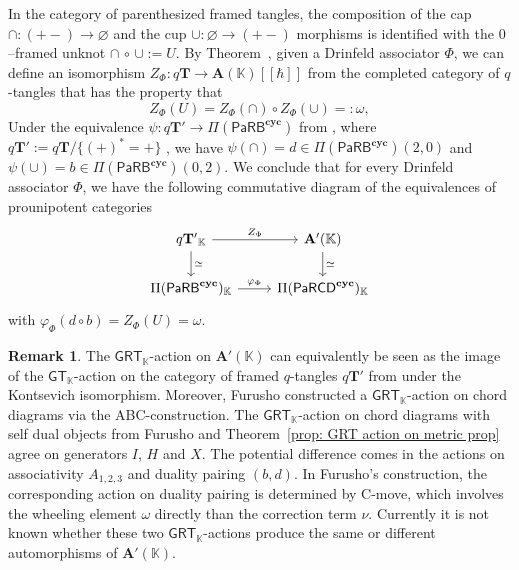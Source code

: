 \documentclass{amsart}
\newcommand{\bT}{\mathbf{T}}
\newcommand{\bA}{\mathbf{A}}
\newcommand{\kk}{\mathbb{K}}    %
\newcommand{\PaRB}{\mathsf{PaRB}}
\newcommand{\PaRCD}{\mathsf{PaRCD}}
\newcommand{\cyc}{\mathbf{cyc}}
\newcommand{\id}{\operatorname{id}}
\newcommand{\GT}{{\mathsf{GT}}}
\newcommand{\GRT}{{\mathsf{GRT}}}
\theoremstyle{definition}
\newtheorem{remark}[theorem]{Remark}%
\numberwithin{equation}{section}
\begin{document}
In the category of parenthesized framed tangles, the composition of the cap $\cap:(+{-})\to \varnothing$ and the cup $\cup:\varnothing \to(+{-})$ morphisms is identified with the $0$--framed unknot $\cap \,\circ \,\cup:= U$. By Theorem~\cite[Theorem 4.7]{KT_Tangles}, given a Drinfeld associator $\Phi$, we can define an isomorphism  $Z_{\Phi}:q\mathbf{T}\rightarrow \bA(\kk)[[\hbar]]$ from the completed category of $q$-tangles that has the property that \[
Z_{\Phi}(U)=Z_{\Phi}(\cap)\circ Z_{\Phi}(\cup)=:\omega, %
\] 
Under the equivalence $\psi: q\mathbf{T'} \rightarrow \Pi(\PaRB^{\cyc})$ from \cite[Proposition~6.5]{RS2025cyclicgt}, where $q\mathbf{T'} := q\mathbf{T}/ \{(+)^* = +\}$ , we have $\psi(\cap) = d \in \Pi(\PaRB^{\cyc})(2,0)$ and $\psi(\cup) = b \in \Pi(\PaRB^{\cyc})(0,2)$. We conclude that for every Drinfeld associator $\Phi$, we have the following commutative diagram of the equivalences of prounipotent categories
\[\begin{tikzcd} q\mathbf{T'}_{\kk}\arrow[d, "\simeq"] \arrow[r, "Z_{\Phi}"] & \bA'(\kk)\arrow[d, "\simeq"]\\
\Pi(\PaRB^{\cyc})_{\kk} \arrow[r, "\varphi_{\Phi}"] & \Pi(\PaRCD^{\cyc})_{\kk}\end{tikzcd}\] with $\varphi_{\Phi}(d\circ b)=Z_{\Phi}(U)=\omega$.


\begin{remark}\label{remark: two GRT actions}
The $\GRT_{\kk}$-action on $\bA'(\kk)$ can equivalently be seen as the image of the $\GT_{\kk}$-action on the category of framed $q$-tangles $q\bT'$ from \cite{RS2025cyclicgt} under the Kontsevich isomorphism. Moreover, Furusho \cite{furusho_galois_2020} constructed a $\GRT_{\kk}$-action on chord diagrams via the ABC-construction. The $\GRT_{\kk}$-action on chord diagrams with self dual objects from Furusho and Theorem~\ref{prop: GRT action on metric prop} agree on generators $I$, $H$ and $X$. The potential difference comes in the actions on associativity $A_{1,2,3}$ and duality pairing $(b,d)$. In Furusho's construction, the corresponding action on duality pairing is determined by C-move, which involves the wheeling element $\omega$ directly than the correction term $\nu$. Currently it is not known whether these two $\GRT_{\kk}$-actions produce the same or different automorphisms of $\bA'(\kk)$. 

\end{remark}









\end{document}
